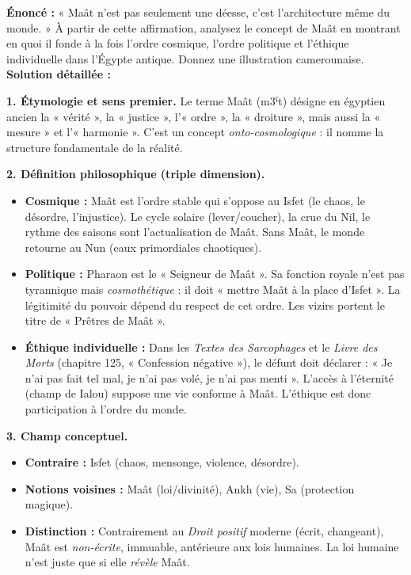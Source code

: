 \documentclass[11pt]{article}
\newcommand{\cle}[1]{{\popxbold\color{popdark}#1}}
\begin{document}
\begin{exoresolu}
\textbf{Énoncé :} « Maât n'est pas seulement une déesse, c'est l'architecture même du monde. » À partir de cette affirmation, analysez le concept de Maât en montrant en quoi il fonde à la fois l'ordre cosmique, l'ordre politique et l'éthique individuelle dans l'Égypte antique. Donnez une illustration camerounaise.
\tcblower
\textbf{Solution détaillée :}

\textbf{1. Étymologie et sens premier.}
Le terme \cle{Maât} (m3ˁt) désigne en égyptien ancien la « vérité », la « justice », l'« ordre », la « droiture », mais aussi la « mesure » et l'« harmonie ». C'est un concept \emph{onto-cosmologique} : il nomme la structure fondamentale de la réalité.

\textbf{2. Définition philosophique (triple dimension).}
\begin{itemize}
    \item \textbf{Cosmique :} Maât est l'ordre stable qui s'oppose au \cle{Isfet} (le chaos, le désordre, l'injustice). Le cycle solaire (lever/coucher), la crue du Nil, le rythme des saisons sont l'actualisation de Maât. Sans Maât, le monde retourne au Nun (eaux primordiales chaotiques).
    \item \textbf{Politique :} Pharaon est le « Seigneur de Maât ». Sa fonction royale n'est pas tyrannique mais \emph{cosmothétique} : il doit « mettre Maât à la place d'Isfet ». La légitimité du pouvoir dépend du respect de cet ordre. Les vizirs portent le titre de « Prêtres de Maât ».
    \item \textbf{Éthique individuelle :} Dans les \emph{Textes des Sarcophages} et le \emph{Livre des Morts} (chapitre 125, « Confession négative »), le défunt doit déclarer : « Je n'ai pas fait tel mal, je n'ai pas volé, je n'ai pas menti ». L'accès à l'éternité (champ de Ialou) suppose une vie conforme à Maât. L'éthique est donc participation à l'ordre du monde.
\end{itemize}

\textbf{3. Champ conceptuel.}
\begin{itemize}
    \item \textbf{Contraire :} \cle{Isfet} (chaos, mensonge, violence, désordre).
    \item \textbf{Notions voisines :} \cle{Maât} (loi/divinité), \cle{Ankh} (vie), \cle{Sa} (protection magique).
    \item \textbf{Distinction :} Contrairement au \emph{Droit positif} moderne (écrit, changeant), Maât est \emph{non-écrite}, immuable, antérieure aux lois humaines. La loi humaine n'est juste que si elle \emph{révèle} Maât.
\end{itemize}


\end{exoresolu}
\end{document}
